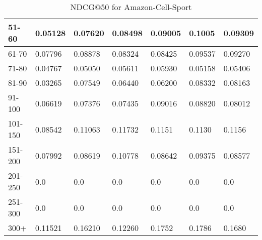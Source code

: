 \begin{table*}[]
\begin{tabular}{|l|l|l|l|l|l|l|}
    51-60   & 0.05128                        & 0.07620                        & 0.08498                        & 0.09005                        & 0.1005                         & 0.09309                        \\ \hline
    61-70   & 0.07796                        & 0.08878                        & 0.08324                        & 0.08425                        & 0.09537                        & 0.09270                        \\ \hline
    71-80   & 0.04767                        & 0.05050                        & 0.05611                        & 0.05930                        & 0.05158                        & 0.05406                        \\ \hline
    81-90   & 0.03265                        & 0.07549                        & 0.06440                        & 0.06200                        & 0.08332                        & 0.08163                        \\ \hline
    91-100  & 0.06619                        & 0.07376                        & 0.07435                        & 0.09016                        & 0.08820                        & 0.08012                        \\ \hline
    101-150 & 0.08542                        & 0.11063                        & 0.11732                        & 0.1151                         & 0.1130                         & 0.1156                         \\ \hline
    151-200 & 0.07992                        & 0.08619                        & 0.10778                        & 0.08642                        & 0.09375                        & 0.08577                        \\ \hline
    201-250 & 0.0                            & 0.0                            & 0.0                            & 0.0                            & 0.0                            & 0.0                            \\ \hline
    251-300 & 0.0                            & 0.0                            & 0.0                            & 0.0                            & 0.0                            & 0.0                            \\ \hline
    300+    & 0.11521                        & 0.16210                        & 0.12260                        & 0.1752                         & 0.1786                         & 0.1680                         \\ \hline
    \end{tabular}
    \caption{NDCG@50 for Amazon-Cell-Sport}
    \label{tab:Amazon-Cell-Sport-recall-evaluation}
\end{table*}